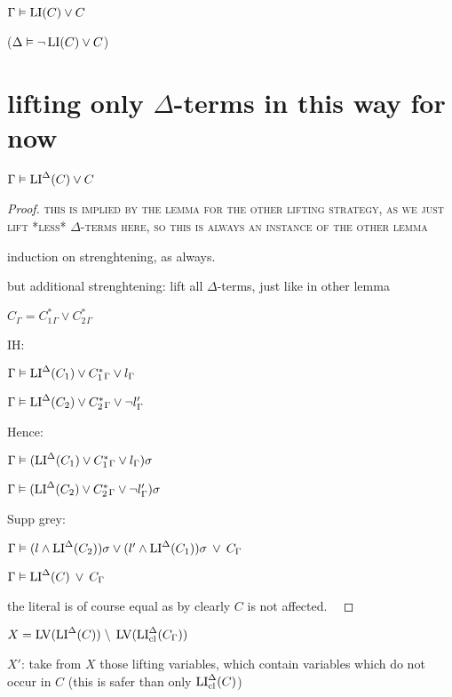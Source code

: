 \documentclass[,%
	draft=false,%
	numbers=noendperiod
	11pt,
	a4paper,
	oneside,%
	openany,
]{memoir}
\begin{document}
$\Gamma \vDash \operatorname{LI}(C) \lor C$

($\Delta \vDash \lnot \operatorname{LI}(C) \lor C$)

\section{lifting only $\Delta$-terms in this way for now}


\begin{clemma}
	$\Gamma \vDash \operatorname{LI}^\Delta(C) \lor C$
\end{clemma}
\begin{proof}
	\textsc{this is implied by the lemma for the other lifting strategy, as we just lift *less* $\Delta$-terms here, so this is always an instance of the other lemma}

	induction on strenghtening, as always.

	but additional strenghtening: lift all $\Delta$-terms, just like in other lemma

	{ \tiny

		$C_\Gamma =
		C_1^*{}_\Gamma \lor
		C_2^*{}_\Gamma$

		IH:

		$\Gamma \vDash \operatorname{LI}^\Delta(C_1) \lor C_1^*{}_\Gamma \lor l_\Gamma$

		$\Gamma \vDash \operatorname{LI}^\Delta(C_2) \lor C_2^*{}_\Gamma \lor \lnot l'_\Gamma$

		Hence:

		$\Gamma \vDash ( \operatorname{LI}^\Delta(C_1) \lor C_1^*{}_\Gamma \lor l_\Gamma )\sigma$

		$\Gamma \vDash ( \operatorname{LI}^\Delta(C_2) \lor C_2^*{}_\Gamma \lor \lnot l'_\Gamma )\sigma$

		Supp grey:

		$\Gamma \vDash
		(l \land \operatorname{LI}^\Delta(C_2))\sigma \lor (l' \land \operatorname{LI}^\Delta(C_1))\sigma
		\;\,{\lor}\;\, C_\Gamma $

		$\Gamma \vDash  \operatorname{LI}^\Delta(C) \;\,{\lor}\;\, C_\Gamma $

		the literal is of course equal as by clearly $C$ is not affected.
		~


	}
\end{proof}

$X = \operatorname{LV}(\operatorname{LI}^\Delta(C)) \;{\setminus}\; \operatorname{LV}(\operatorname{LI}_{\operatorname{cl}}^\Delta(C_\Gamma))$

$X'$: take from $X$ those lifting variables, which contain variables which do not occur in $C$ (this is safer than only $\operatorname{LI}_{\operatorname{cl}}^\Delta(C)$)
\end{document}
